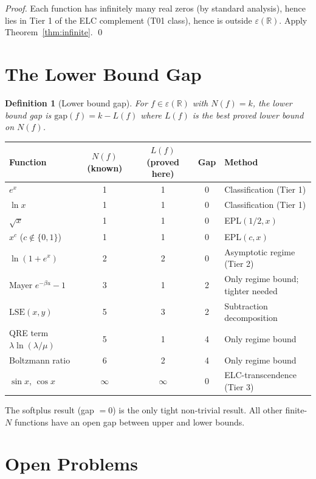 \documentclass[11pt]{article}
\newtheorem{definition}[theorem]{Definition}
\begin{document}
\begin{proof}
Each function has infinitely many real zeros (by standard analysis), hence
lies in Tier 1 of the ELC complement (T01 class), hence is outside
$\varepsilon(\mathbb{R})$. Apply Theorem~\ref{thm:infinite}. \qed
\end{proof}

\section{The Lower Bound Gap}

\begin{definition}[Lower bound gap]
For $f \in \varepsilon(\mathbb{R})$ with $N(f) = k$, the \emph{lower bound gap}
is $\mathrm{gap}(f) = k - L(f)$ where $L(f)$ is the best proved lower bound on $N(f)$.
\end{definition}

\begin{center}
\renewcommand{\arraystretch}{1.2}
\begin{tabular}{lcccl}
\toprule
Function & $N(f)$ (known) & $L(f)$ (proved here) & Gap & Method \\
\midrule
$e^x$ & 1 & 1 & 0 & Classification (Tier 1) \\
$\ln x$ & 1 & 1 & 0 & Classification (Tier 1) \\
$\sqrt{x}$ & 1 & 1 & 0 & EPL$(1/2, x)$ \\
$x^c$ ($c \notin \{0,1\}$) & 1 & 1 & 0 & EPL$(c, x)$ \\
$\ln(1+e^x)$ & 2 & 2 & 0 & Asymptotic regime (Tier 2) \\
Mayer $e^{-\beta u}-1$ & 3 & 1 & 2 & Only regime bound; tighter needed \\
$\mathrm{LSE}(x,y)$ & 5 & 3 & 2 & Subtraction decomposition \\
QRE term $\lambda \ln(\lambda/\mu)$ & 5 & 1 & 4 & Only regime bound \\
Boltzmann ratio & 6 & 2 & 4 & Only regime bound \\
$\sin x$, $\cos x$ & $\infty$ & $\infty$ & 0 & ELC-transcendence (Tier 3) \\
\bottomrule
\end{tabular}
\end{center}

The softplus result (gap $= 0$) is the only tight non-trivial result.
All other finite-$N$ functions have an open gap between upper and lower bounds.

\section{Open Problems}
\end{document}
